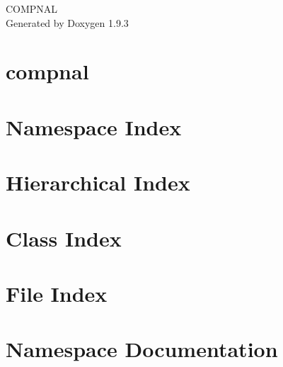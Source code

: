 \documentclass[twoside]{book}
\newcommand{\+}{\discretionary{\mbox{\scriptsize$\hookleftarrow$}}{}{}}
\newcommand{\clearemptydoublepage}{%
    \newpage{\pagestyle{empty}\cleardoublepage}%
  }
\begin{document}
  \raggedbottom
    \hypersetup{pageanchor=false,
                bookmarksnumbered=true,
                pdfencoding=unicode
               }
  \begin{titlepage}
  \vspace*{7cm}
  \begin{center}%
  {\Large COMPNAL}\\
  \vspace*{1cm}
  {\large Generated by Doxygen 1.9.3}\\
  \end{center}
  \end{titlepage}
  \clearemptydoublepage
  \tableofcontents
  \clearemptydoublepage
  \hypersetup{pageanchor=true}
\chapter{compnal}
\label{index}\hypertarget{index}{}
\chapter{Namespace Index}

\chapter{Hierarchical Index}

\chapter{Class Index}

\chapter{File Index}

\chapter{Namespace Documentation}





\end{document}
